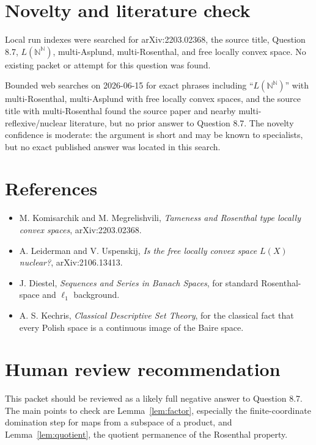 \documentclass[11pt]{article}
\begin{document}
\section*{Novelty and literature check}

Local run indexes were searched for arXiv:2203.02368, the source title,
Question 8.7, \(L(\mathbb N^\mathbb N)\), multi-Asplund, multi-Rosenthal, and
free locally convex space.  No existing packet or attempt for this question
was found.

Bounded web searches on 2026-06-15 for exact phrases including
\(\text{``}L(\mathbb N^\mathbb N)\text{''}\) with multi-Rosenthal,
multi-Asplund with free locally convex spaces, and the source title with
multi-Rosenthal found the source paper and nearby multi-reflexive/nuclear
literature, but no prior answer to Question 8.7.  The novelty confidence is
moderate: the argument is short and may be known to specialists, but no exact
published answer was located in this search.

\section*{References}

\begin{itemize}
\item M. Komisarchik and M. Megrelishvili, \emph{Tameness and Rosenthal type
locally convex spaces}, arXiv:2203.02368.
\item A. Leiderman and V. Uspenskij, \emph{Is the free locally convex space
\(L(X)\) nuclear?}, arXiv:2106.13413.
\item J. Diestel, \emph{Sequences and Series in Banach Spaces}, for standard
Rosenthal-space and \(\ell_1\) background.
\item A. S. Kechris, \emph{Classical Descriptive Set Theory}, for the
classical fact that every Polish space is a continuous image of the Baire
space.
\end{itemize}

\section*{Human review recommendation}

This packet should be reviewed as a likely full negative answer to Question
8.7.  The main points to check are Lemma~\ref{lem:factor}, especially the
finite-coordinate domination step for maps from a subspace of a product, and
Lemma~\ref{lem:quotient}, the quotient permanence of the Rosenthal property.
\end{document}
